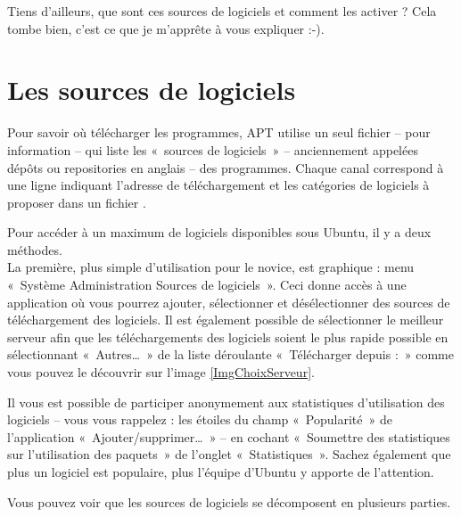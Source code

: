 {\begin{nota}
Tiens d'ailleurs, que sont ces sources de logiciels et comment les activer ? Cela tombe bien, c'est ce que je m'apprête à vous expliquer :-).
\end{nota}
\section{Les sources de logiciels}
\label{RefSourceMAJ}
Pour savoir où télécharger les programmes, APT utilise un seul fichier --  pour information -- qui liste les «~sources de logiciels~» -- anciennement appelées dépôts ou repositories en anglais -- des programmes. Chaque canal correspond à une ligne indiquant l'adresse de téléchargement et les catégories de logiciels à proposer dans un fichier .\par
Pour accéder à un maximum de logiciels disponibles sous Ubuntu, il y a deux méthodes.\\
La première, plus simple d'utilisation pour le novice, est graphique : menu «~Système \FlecheDroite Administration \FlecheDroite Sources de logiciels~». Ceci donne accès à une application où vous pourrez ajouter, sélectionner et désélectionner des sources de téléchargement des logiciels. Il est également possible de sélectionner le meilleur serveur afin que les téléchargements des logiciels soient le plus rapide possible en sélectionnant «~Autres\ldots{}~» de la liste déroulante «~Télécharger depuis :~» comme vous pouvez le découvrir sur l'image \ref{ImgChoixServeur}.\par
{}
\begin{nota}
Il vous est possible de participer anonymement aux statistiques d'utilisation des logiciels -- vous vous rappelez : les étoiles du champ «~Popularité~» de l'application «~Ajouter/supprimer\dots{}~» -- en cochant «~Soumettre des statistiques sur l'utilisation des paquets~» de l'onglet «~Statistiques~». Sachez également que plus un logiciel est populaire, plus l'équipe d'Ubuntu y apporte de l'attention.
\end{nota}
Vous pouvez voir que les sources de logiciels se décomposent en plusieurs parties.
}

